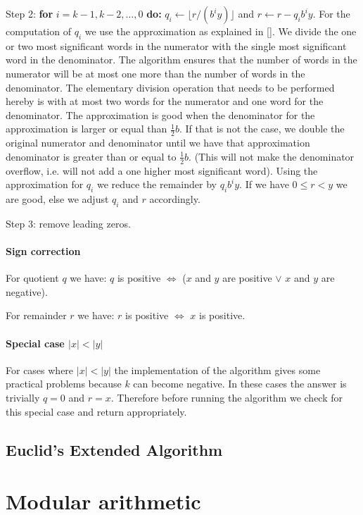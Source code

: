 \documentclass[a4paper]{article}
\begin{document}
Step 2: \textbf{for} $i = k-1, k-2, \ldots, 0$ \textbf{do:}
$q_i \gets \lfloor r / (b^i y) \rfloor$ and $r \gets r - q_i b^i y$.
For the computation of $q_i$ we use the approximation as explained in [\cite{ant}].
We divide the one or two most significant words in the numerator with the single most significant word in the denominator. The algorithm ensures that the number of words in the numerator will be at most one more than the number of words in the denominator.
The elementary division operation that needs to be performed hereby is with at most two words for the numerator and one word for the denominator.
The approximation is good when the denominator for the approximation is larger or equal than $\frac{1}{2} b$. If that is not the case, we double the original numerator and denominator until we have that approximation denominator is greater than or equal to $\frac{1}{2} b$. (This will not make the denominator overflow, i.e. will not add a one higher most significant word).
Using the approximation for $q_i$ we reduce the remainder by $q_i b^i y$.
If we have $0 \le r < y$ we are good, else we adjust $q_i$ and $r$ accordingly.

Step 3: remove leading zeros.


\paragraph{Sign correction}

For quotient $q$ we have: $q$ is positive $\iff$ ($x$ and $y$ are positive $\lor$ $x$ and $y$ are negative).

For remainder $r$ we have: $r$ is positive $\iff$ $x$ is positive.

\paragraph{Special case $|x|<|y|$}

For cases where $|x|<|y|$ the implementation of the algorithm gives some practical problems because $k$ can become negative.
In these cases the answer is trivially $q=0$ and $r=x$.
Therefore before running the algorithm we check for this special case and return appropriately.


\subsection{Euclid’s Extended Algorithm}


\section{Modular arithmetic}
\end{document}
